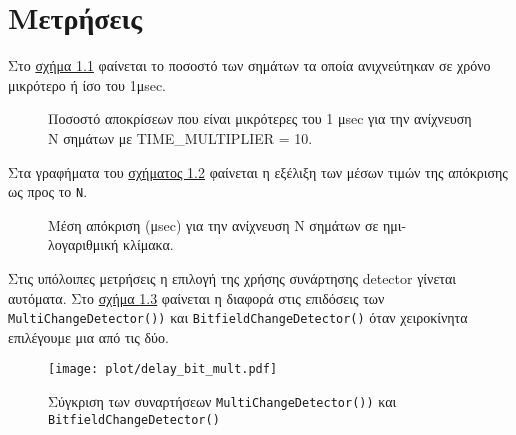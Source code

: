 \chapter{Μετρήσεις}
Στο \hyperref[fig:1compare]{σχήμα \ref*{fig:1compare}} φαίνεται το ποσοστό των σημάτων τα οποία ανιχνεύτηκαν σε χρόνο μικρότερο ή ίσο του 1μsec.

\begin{figure}[h]
    \centering
    \caption{Ποσοστό αποκρίσεων που είναι μικρότερες του 1 μsec για την ανίχνευση N σημάτων με TIME\_MULTIPLIER = 10.}
    \label{fig:1compare}
\end{figure}

Στα γραφήματα του \hyperref[fig:delay]{σχήματος \ref*{fig:delay}}
φαίνεται η εξέλιξη των μέσων τιμών της απόκρισης ως προς το \lstinline!N!. 

\begin{figure}[h]
    \centering
    
    
    \caption{Μέση απόκριση (μsec) για την ανίχνευση N σημάτων σε ημι-λογαριθμική κλίμακα.}
    \label{fig:delay}
\end{figure}

Στις υπόλοιπες μετρήσεις η επιλογή της χρήσης συνάρτησης detector γίνεται αυτόματα.
Στο \hyperref[fig:bit_multi]{σχήμα \ref*{fig:bit_multi}} φαίνεται η διαφορά στις επιδόσεις των
\lstinline!MultiChangeDetector())! και \lstinline!BitfieldChangeDetector()! όταν χειροκίνητα επιλέγουμε μια από τις δύο.

\begin{figure}[h]
    \centering
    \texttt{[image: plot/delay\_bit\_mult.pdf]}
    \caption{Σύγκριση των συναρτήσεων \lstinline!MultiChangeDetector())! και \lstinline!BitfieldChangeDetector()!}
    \label{fig:bit_multi}
\end{figure}